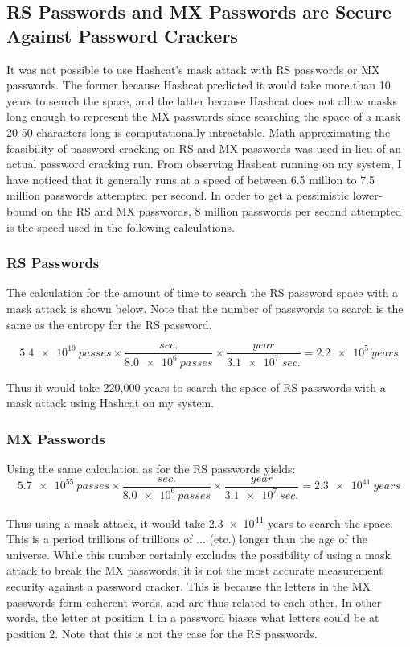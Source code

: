 \documentclass{article}
\begin{document}
\subsection*{RS Passwords and MX Passwords are Secure Against Password Crackers}
It was not possible to use Hashcat's mask attack with RS passwords or MX passwords. The former because Hashcat predicted it would take more than 10 years to search the space, and the latter because Hashcat does not allow masks long enough to represent the MX passwords since searching the space of a mask 20-50 characters long is computationally intractable. Math approximating the feasibility of password cracking on RS and MX passwords was used in lieu of an actual password cracking run. From observing Hashcat running on my system, I have noticed that it generally runs at a speed of between 6.5 million to 7.5 million passwords attempted per second. In order to get a pessimistic lower-bound on the RS and MX passwords, 8 million passwords per second attempted is the speed used in the following calculations. 

\subsubsection*{RS Passwords}
The calculation for the amount of time to search the RS password space with a mask attack is shown below. Note that the number of passwords to search is the same as the entropy for the RS password.

$$\num{5.4e19}~passes \times \frac{sec.}{\num{8.0e6}~passes} \times \frac{year}{\num{3.1e7}~sec.} = \num{2.2e5}~years$$

Thus it would take 220,000 years to search the space of RS passwords with a mask attack using Hashcat on my system.

\subsubsection*{MX Passwords}
Using the same calculation as for the RS passwords yields:
$$\num{5.7e55}~passes \times \frac{sec.}{\num{8.0e6}~passes} \times \frac{year}{\num{3.1e7}~sec.} = \num{2.3e41}~years$$

Thus using a mask attack, it would take \num{2.3e41} years to search the space. This is a period trillions of trillions of ... (etc.) longer than the age of the universe. While this number certainly excludes the possibility of using a mask attack to break the MX passwords, it is not the most accurate measurement security against a password cracker. This is because the letters in the MX passwords form coherent words, and are thus related to each other. In other words, the letter at position 1 in a password biases what letters could be at position 2. Note that this is not the case for the RS passwords.
\end{document}
